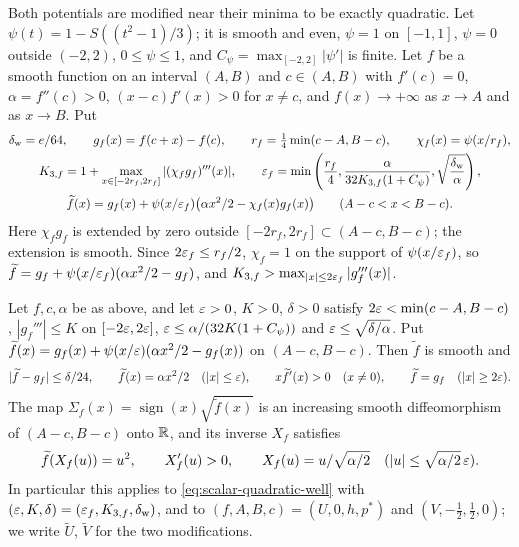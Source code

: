 Both potentials are modified near their minima to be exactly quadratic. Let
$\psi(t)=1-S((t^2-1)/3)$; it is smooth and even, $\psi=1$ on $[-1,1]$, $\psi=0$ outside $(-2,2)$, $0\le\psi\le1$,
and $C_\psi=\max_{[-2,2]}|\psi'|$ is finite. Let $f$ be a smooth function on an interval $(A,B)$ and $c\in(A,B)$ with
$f'(c)=0$, $\alpha=f''(c)>0$, $(x-c)f'(x)>0$ for $x\ne c$, and $f(x)\to+\infty$ as $x\to A$ and as $x\to B$. Put
\begin{gather}\label{eq:scalar-quadratic-well}
 \delta_{\rm w}=e/64,\qquad g_f(x)=f(c+x)-f(c),\qquad r_f=\tfrac14\min(c-A,B-c),\qquad
 \chi_f(x)=\psi(x/r_f),\\
 K_{3,f}=1+\max_{x\in[-2r_f,2r_f]}|(\chi_fg_f)'''(x)|,\qquad
 \varepsilon_f=\min\left(\frac{r_f}{4},\frac{\alpha}{32K_{3,f}(1+C_\psi)},
                           \sqrt{\frac{\delta_{\rm w}}\alpha}\right),\notag\\
 \widetilde f(x)=g_f(x)+\psi(x/\varepsilon_f)\bigl(\alpha x^2/2-\chi_f(x)g_f(x)\bigr)\qquad(A-c<x<B-c).
 \notag
\end{gather}
Here $\chi_fg_f$ is extended by zero outside $[-2r_f,2r_f]\subset(A-c,B-c)$; the extension is smooth. Since
$2\varepsilon_f\le r_f/2$, $\chi_f=1$ on the support of $\psi(x/\varepsilon_f)$, so
$\widetilde f=g_f+\psi(x/\varepsilon_f)(\alpha x^2/2-g_f)$, and $K_{3,f}>\max_{|x|\le2\varepsilon_f}|g_f'''(x)|$.

\begin{lemma}\label{lem:scalar-wells}
Let $f,c,\alpha$ be as above, and let $\varepsilon>0$, $K>0$, $\delta>0$ satisfy $2\varepsilon<\min(c-A,B-c)$,
$|g_f'''|\le K$ on $[-2\varepsilon,2\varepsilon]$, $\varepsilon\le\alpha/(32K(1+C_\psi))$ and $\varepsilon\le\sqrt{\delta/\alpha}$. Put
$\widetilde f(x)=g_f(x)+\psi(x/\varepsilon)(\alpha x^2/2-g_f(x))$ on $(A-c,B-c)$. Then $\widetilde f$ is smooth and
\[
 |\widetilde f-g_f|\le\delta/24,\qquad
 \widetilde f(x)=\alpha x^2/2\quad(|x|\le\varepsilon),\qquad
 x\widetilde f'(x)>0\quad(x\ne0),\qquad \widetilde f=g_f\quad(|x|\ge2\varepsilon).
\]
The map $\Sigma_f(x)=\operatorname{sign}(x)\sqrt{\widetilde f(x)}$ is an increasing smooth diffeomorphism of
$(A-c,B-c)$ onto $\mathbb{R}$, and its inverse $X_f$ satisfies
\[
 \widetilde f(X_f(u))=u^2,\qquad X_f'(u)>0,\qquad
 X_f(u)=u/\sqrt{\alpha/2}\quad(|u|\le\sqrt{\alpha/2}\,\varepsilon).
\]
In particular this applies to \eqref{eq:scalar-quadratic-well} with $(\varepsilon,K,\delta)=(\varepsilon_f,K_{3,f},\delta_{\rm w})$,
and to $(f,A,B,c)=(U,0,h,p^*)$ and $(V,-\frac12,\frac12,0)$; we write $\widetilde U$, $\widetilde V$ for the two
modifications.
{\normalfont {}}
\end{lemma}

